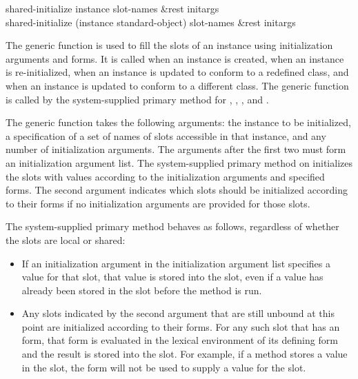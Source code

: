 \begin{defun}
shared-initialize instance slot-names &rest initargs \\
shared-initialize (instance standard-object) slot-names &rest initargs

The generic function  is used to fill the slots
of an instance using initialization arguments and 
forms.  It is called when an instance is created, when an instance is
re-initialized, when an instance is updated to conform to a redefined
class, and when an instance is updated to conform to a different
class.  The generic function  is called by the
system-supplied primary method for , 
,
, and
.

The generic function  takes the following
arguments: the instance to be initialized, a specification of a set of
names of slots accessible in that instance, and any number of initialization
arguments.  The arguments after the first two must form an initialization
argument list.  The system-supplied primary method on 
 initializes the slots with values according to the
initialization arguments and specified  forms.  The
second argument indicates which slots should be initialized according
to their  forms if no initialization arguments are
provided for those slots. 

The system-supplied primary method behaves as follows, regardless of
whether the slots are local or shared: 

\begin{itemize}
\item  If an initialization argument in the
initialization argument list specifies a value for that slot, that
value is stored into the slot,  even if a value has
already been stored in the slot before the method is run.

\item  Any slots indicated by the second argument that are still
unbound at this point are initialized according to their 
 forms.  For any such slot that has an  form,
that form is evaluated in the lexical environment of its defining 
 form and the result is stored into the slot.  For example, if
a  method stores a value in the slot, the 
form will not be used to supply a value for the slot.


\end{itemize}
\end{defun}
